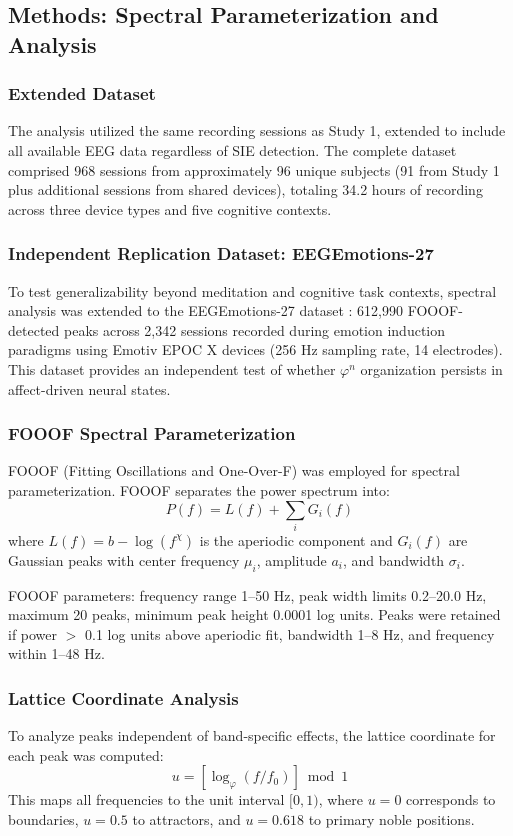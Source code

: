 \documentclass[11pt,a4paper]{article}
\newcommand{\phisym}{\varphi}
\begin{document}
\subsection{Methods: Spectral Parameterization and Analysis}

\subsubsection{Extended Dataset}
The analysis utilized the same recording sessions as Study 1, extended to include all available EEG data regardless of SIE detection. The complete dataset comprised 968 sessions from approximately 96 unique subjects (91 from Study 1 plus additional sessions from shared devices), totaling 34.2 hours of recording across three device types and five cognitive contexts.

\subsubsection{Independent Replication Dataset: EEGEmotions-27}
To test generalizability beyond meditation and cognitive task contexts, spectral analysis was extended to the EEGEmotions-27 dataset \parencite{huy2025eeg}: 612,990 FOOOF-detected peaks across 2,342 sessions recorded during emotion induction paradigms using Emotiv EPOC X devices (256 Hz sampling rate, 14 electrodes). This dataset provides an independent test of whether $\phisym^n$ organization persists in affect-driven neural states.

\subsubsection{FOOOF Spectral Parameterization}
FOOOF (Fitting Oscillations and One-Over-F) \parencite{donoghue2020fooof} was employed for spectral parameterization. FOOOF separates the power spectrum into:
\begin{equation}
P(f) = L(f) + \sum_{i} G_i(f)
\end{equation}
where $L(f) = b - \log(f^\chi)$ is the aperiodic component and $G_i(f)$ are Gaussian peaks with center frequency $\mu_i$, amplitude $a_i$, and bandwidth $\sigma_i$.

FOOOF parameters: frequency range 1--50 Hz, peak width limits 0.2--20.0 Hz, maximum 20 peaks, minimum peak height 0.0001 log units. Peaks were retained if power $>$ 0.1 log units above aperiodic fit, bandwidth 1--8 Hz, and frequency within 1--48 Hz.

\subsubsection{Lattice Coordinate Analysis}
To analyze peaks independent of band-specific effects, the lattice coordinate for each peak was computed:
\begin{equation}
u = \left[\log_\phisym(f/f_0)\right] \bmod 1
\end{equation}
This maps all frequencies to the unit interval $[0, 1)$, where $u = 0$ corresponds to boundaries, $u = 0.5$ to attractors, and $u = 0.618$ to primary noble positions.
\end{document}
